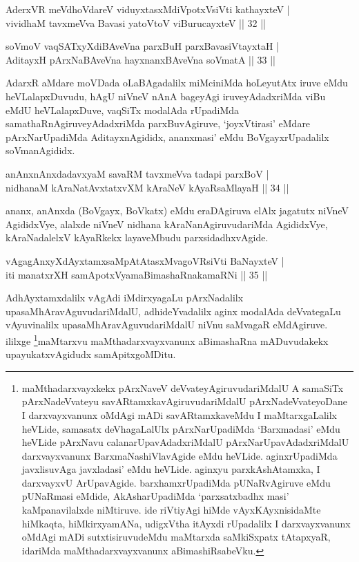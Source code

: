\begin{shl}
AderxVR meVdhoVdareV viduyxtasxMdiVpotxV\s siVti kathayxteV | \\
vividhaM tavxmeVva Bavasi yatoV\s toV viBurucayxteV \hfill|| 32 || 
\end{shl}

\begin{shl}
soVmoV vaqSATxyXdiBAveVna parxBuH parxBavasiVtayxtaH | \\
AditayxH pArxNaBAveVna hayxnanxBAveVna soVmatA \hfill|| 33 || 
\end{shl}

\begin{artha}
AdarxR aMdare moVDada oLaBAgadalilx miMciniMda hoLeyutAtx iruve eMdu heVLalapxDuvudu, hAgU niVneV nAnA bageyAgi iruveyAdadxriMda viBu eMdU heVLalapxDuve, vaqSiTx modalAda rUpadiMda samathaRnAgiruveyAdadxriMda parxBuvAgiruve, `joyxVtirasi' eMdare pArxNarUpadiMda AditayxnAgididx, ananxmasi' eMdu BoVgayxrUpadalilx soVmanAgididx.
\end{artha}

\begin{shl}
anAnxnAnxdadavxyaM savaRM tavxmeVva tadapi parxBoV | \\
nidhanaM kAraNatAvxtatxvXM kAraNeV kAyaRsaMlayaH \hfill|| 34 || 
\end{shl}

\begin{artha}
ananx, anAnxda (BoVgayx, BoVkatx) eMdu eraDAgiruva elAlx jagatutx niVneV AgididxVye, alalxde niVneV nidhana kAraNanAgiruvudariMda AgididxVye, kAraNadalelxV kAyaRkekx layaveMbudu parxsidadhxvAgide.
\end{artha}

\begin{shl}
vAgagAnxyXdAyxtamxsaMpAtAtasxMvagoVR\s siVti BaNayxteV | \\
iti manatxrXH samApotxV\s yamaBimashaRnakamaRNi \hfill|| 35 || 
\end{shl}

\begin{artha}
AdhAyxtamxdalilx vAgAdi iMdirxyagaLu pArxNadalilx upasaMhAravAguvudariMdalU, adhideYvadalilx aginx modalAda deVvategaLu vAyuvinalilx upasaMhAravAguvudariMdalU niVnu saMvagaR eMdAgiruve. ililxge \footnote{maMthadarxvayxkekx pArxNaveV deVvateyAgiruvudariMdalU A samaSiTx pArxNadeVvateyu savARtamxkavAgiruvudariMdalU pArxNadeVvateyoDane I darxvayxvanunx oMdAgi mADi savARtamxkaveMdu I maMtarxgaLalilx heVLide, samasatx deVhagaLalUlx pArxNarUpadiMda `Barxmadasi' eMdu heVLide pArxNavu calanarUpavAdadxriMdalU pArxNarUpavAdadxriMdalU darxvayxvanunx BarxmaNashiVlavAgide eMdu heVLide. aginxrUpadiMda javxlisuvAga javxladasi' eMdu heVLide. aginxyu parxkAshAtamxka, I darxvayxvU ArUpavAgide. barxhamxrUpadiMda pUNaRvAgiruve eMdu pUNaRmasi eMdide, AkAsharUpadiMda `parxsatxbadhx masi' kaMpanavilalxde niMtiruve. ide riVtiyAgi hiMde vAyxKAyxnisidaMte hiMkaqta, hiMkirxyamANa, udigxVtha itAyxdi rUpadalilx I darxvayxvanunx oMdAgi mADi sutxtisiruvudeMdu maMtarxda saMkiSxpatx tAtapxyaR, idariMda maMthadarxvayxvanunx aBimashiRsabeVku.}maMtarxvu maMthadarxvayxvanunx aBimashaRna mADuvudakekx upayukatxvAgidudx samApitxgoMDitu.
\end{artha}

